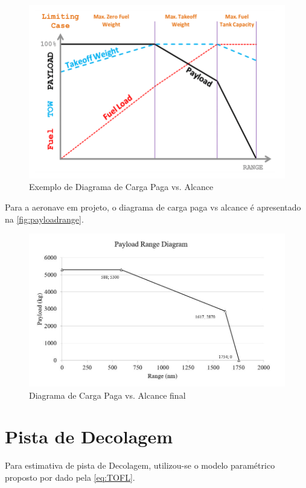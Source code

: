 \begin{figure}[H]
\centering
\includegraphics[width=120mm]{images/parte4/payloadrangediagram.png}
\caption{Exemplo de Diagrama de Carga Paga vs. Alcance}
\label{fig:payloadrangediagram}
\end{figure}

Para a aeronave em projeto, o diagrama de carga paga vs alcance é apresentado na \autoref{fig:payloadrange}.

\begin{figure}[H]
\centering
\includegraphics[width=1.\textwidth]{images/parte4/payload_range.JPG}
\caption{Diagrama de Carga Paga vs. Alcance final}
\label{fig:payloadrange}
\end{figure}

\section{Pista de Decolagem}

Para estimativa de pista de Decolagem, utilizou-se o modelo paramétrico proposto por \cite{lukaczyk2015suave} dado pela \autoref{eq:TOFL}.

